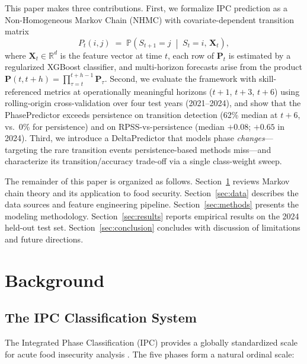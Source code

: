 \documentclass[11pt,letterpaper]{article}
\newcommand{\R}{\mathbb{R}}
\newcommand{\Prob}{\mathbb{P}}
\begin{document}
This paper makes three contributions. First, we formalize IPC prediction as a Non-Homogeneous Markov Chain (NHMC) with covariate-dependent transition matrix
\begin{equation}\label{eq:nhmc}
  P_t(i,j) \;=\; \Prob\!\left(S_{t+1} = j \;\middle|\; S_t = i,\, \mathbf{X}_t\right),
\end{equation}
where $\mathbf{X}_t \in \R^d$ is the feature vector at time $t$, each row of $\mathbf{P}_t$ is estimated by a regularized XGBoost classifier, and multi-horizon forecasts arise from the product $\mathbf{P}(t,t\!+\!h) = \prod_{\tau=t}^{t+h-1} \mathbf{P}_\tau$. Second, we evaluate the framework with skill-referenced metrics at operationally meaningful horizons ($t\!+\!1$, $t\!+\!3$, $t\!+\!6$) using rolling-origin cross-validation over four test years (2021--2024), and show that the PhasePredictor exceeds persistence on transition detection (62\% median at $t\!+\!6$, vs.\ 0\% for persistence) and on RPSS-vs-persistence (median $+0.08$; $+0.65$ in 2024). Third, we introduce a DeltaPredictor that models phase \emph{changes}---targeting the rare transition events persistence-based methods miss---and characterize its transition/accuracy trade-off via a single class-weight sweep.

The remainder of this paper is organized as follows. Section~\ref{sec:background} reviews Markov chain theory and its application to food security. Section~\ref{sec:data} describes the data sources and feature engineering pipeline. Section~\ref{sec:methods} presents the modeling methodology. Section~\ref{sec:results} reports empirical results on the 2024 held-out test set. Section~\ref{sec:conclusion} concludes with discussion of limitations and future directions.


\section{Background}\label{sec:background}

\subsection{The IPC Classification System}

The Integrated Phase Classification (IPC) provides a globally standardized scale for acute food insecurity analysis \citep{ipc2021}. The five phases form a natural ordinal scale:
\end{document}
